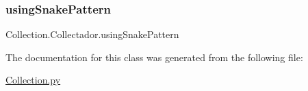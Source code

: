 \subsubsection{\texorpdfstring{usingSnakePattern}{usingSnakePattern}}
{\footnotesize\ttfamily Collection.\+Collectador.\+using\+Snake\+Pattern}



The documentation for this class was generated from the following file\+:\begin{DoxyCompactItemize}
\item 
\mbox{\hyperlink{_collection_8py}{Collection.\+py}}\end{DoxyCompactItemize}
